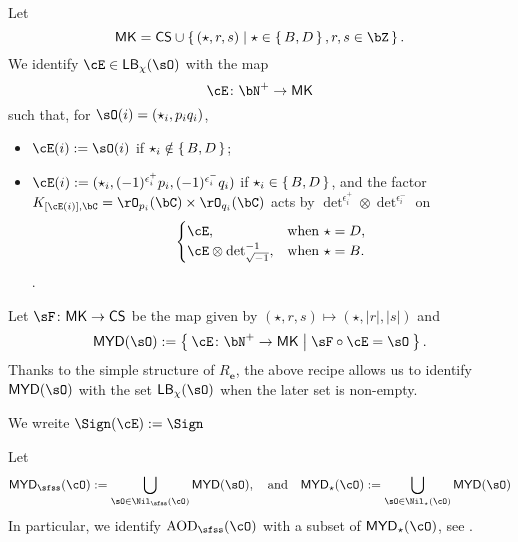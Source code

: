 \documentclass[12pt,a4paper]{amsart}
\def\abs#1{\left|{#1}\right|}
\def\MK{\mathsf{MK}}
\def\MYD{{\mathsf{MYD}}}
\def\AND{\quad\text{and}\quad}
\def\deti{{\det}_{\sqrt{-1}}}
\def\AOD{\mathrm{AOD}}
\newcommand{\X}{\mathbf{X}}
\numberwithin{equation}{section}
\theoremstyle{remark}
\def\X{{\mathbf{e}}}
\begin{document}
Let
\[
  \MK = \CCSS \cup \set{(\star,r,s)|\star\in \set{B,D}, r,s\in \bZ}.
\]
We identify $\cE \in \DCO{\chi}$ with the map
\[
  \cE\colon \bN^{+}\rightarrow  \MK
\]
such that,
for $\sO(i)=(\star_{i},p_{i} q_{i})$,
\begin{itemize}
  \item $\cE(i) := \sO(i)$ if $\star_{i} \notin \set{B,D}$;
  \item $\cE(i) := (\star_{i},(-1)^{\epsilon^{+}_{i}}p_{i},(-1)^{\epsilon^{-}_{i}}q_{i})$
        if $\star_{i}\in \set{B,D}$, and  the factor
        $\KC[[\cE(i)]] =\rO_{p_{i}}(\bC)\times \rO_{q_{i}}(\bC)$ acts by
        ${\det}^{\epsilon^{+}_{i}}\otimes {\det}^{\epsilon^{-}_{i}}$
        on
        \[
        \begin{cases}
          \cE, & \text{when } \star = D,\\
          \cE\otimes \deti^{-1} , & \text{when } \star = B.
        \end{cases}
        \].
\end{itemize}

Let
 $\sF\colon \MK\rightarrow \CCSS$ be the map given by
$(\star,r,s)\mapsto (\star,\abs{r},\abs{s})$ and
\[
  \MYD(\sO) := \Set{\cE\colon \bN^{+}\rightarrow \MK|\sF\circ \cE=\sO }.
\]
Thanks to the simple structure of $R_{\X}$, the above recipe allows us to
identify $\MYD(\sO)$ with the set $\DCO{\chi}$ when the later set is non-empty.

We wreite $\Sign(\cE):= \Sign$

Let
\[
  \MYD_{\sfss}(\cO) := \bigcup_{\sO\in \Nil_{\sfss}(\cO)}\MYD(\sO),%
  \AND
  \MYD_{\star}(\cO) := \bigcup_{\sO\in \Nil_{\star}(\cO)}\MYD(\sO)
\]
 In particular, we identify $\AOD_{\sfss}(\cO)$ with a subset of
 $\MYD_{\star}(\cO)$, see .
\end{document}
